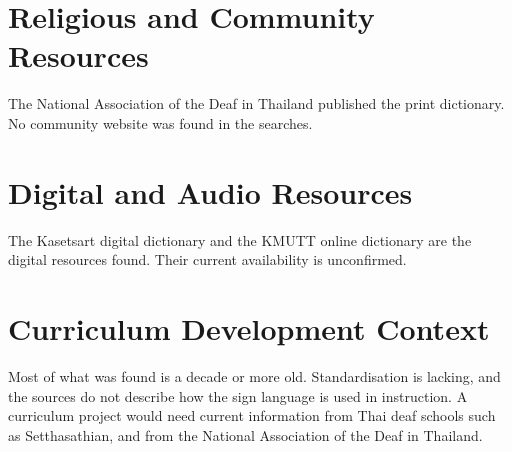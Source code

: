 \documentclass[12pt]{article}
\begin{document}
\section{Religious and Community Resources}
The National Association of the Deaf in Thailand published the print dictionary. No community website was found in the searches.

\section{Digital and Audio Resources}
The Kasetsart digital dictionary and the KMUTT online dictionary are the digital resources found. Their current availability is unconfirmed.

\section{Curriculum Development Context}
Most of what was found is a decade or more old. Standardisation is lacking, and the sources do not describe how the sign language is used in instruction. A curriculum project would need current information from Thai deaf schools such as Setthasathian, and from the National Association of the Deaf in Thailand.
\end{document}
